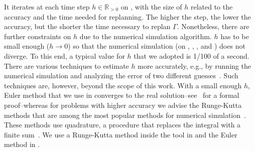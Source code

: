 It iterates at each time step $h\in\mathbb{R}_{>0}$ on , with the size of $h$ related to the accuracy and the time needed for replanning. The higher the step, the lower the accuracy, but the shorter the time necessary to replan $\Gamma$. Nonetheless, there are further constraints on $h$ due to the numerical simulation algorithm. $h$ has to be small enough ($h\rightarrow 0$) so that the numerical simulation (on , , , and ) does not diverge. To this end, a typical value for $h$ that we adopted is 1/100 of a second. There are various techniques to estimate $h$ more accurately, e.g., by running the numerical simulation and analyzing the error of two different guesses~\citep{iserles2009first}. Such techniques are, however, beyond the scope of this work. With a small enough $h$, Euler method that we use in  converges to the real solution--see~\citep{iserles2009first,atkinson2009euler} for a formal proof--whereas for problems with higher accuracy we advise the Runge-Kutta methods that are among the most popular methods for numerical simulation~\citep{atkinson2009euler}. These methods use quadrature, a procedure that replaces the integral with a finite sum~\citep{iserles2009first}. We use a Runge-Kutta method inside the \powprof{} tool in  and the Euler method in .

